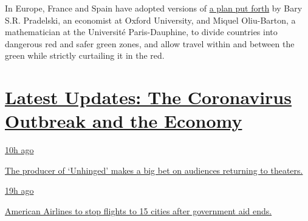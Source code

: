 In Europe, France and Spain have adopted versions of
\href{https://www.oecd-forum.org/channels/1642-international-co-operation/posts/toward-a-european-network-of-green-zones-to-avoid-summer-collapse}{a
plan put forth} by Bary S.R. Pradelski, an economist at Oxford
University, and Miquel Oliu-Barton, a mathematician at the Université
Paris-Dauphine, to divide countries into dangerous red and safer green
zones, and allow travel within and between the green while strictly
curtailing it in the red.

\hypertarget{latest-updates-the-coronavirus-outbreak-and-the-economy}{%
\section{\texorpdfstring{\href{https://www.nytimes3xbfgragh.onion/live/2020/08/20/business/stock-market-today-coronavirus?action=click\&pgtype=Article\&state=default\&region=MAIN_CONTENT_1\&context=storylines_live_updates}{Latest
Updates: The Coronavirus Outbreak and the
Economy}}{Latest Updates: The Coronavirus Outbreak and the Economy}}\label{latest-updates-the-coronavirus-outbreak-and-the-economy}}

\href{https://www.nytimes3xbfgragh.onion/live/2020/08/20/business/stock-market-today-coronavirus?action=click\&pgtype=Article\&state=default\&region=MAIN_CONTENT_1\&context=storylines_live_updates\#the-producer-of-unhinged-makes-a-big-bet-on-audiences-returning-to-theaters}{10h
ago}

\href{https://www.nytimes3xbfgragh.onion/live/2020/08/20/business/stock-market-today-coronavirus?action=click\&pgtype=Article\&state=default\&region=MAIN_CONTENT_1\&context=storylines_live_updates\#the-producer-of-unhinged-makes-a-big-bet-on-audiences-returning-to-theaters}{The
producer of `Unhinged' makes a big bet on audiences returning to
theaters.}

\href{https://www.nytimes3xbfgragh.onion/live/2020/08/20/business/stock-market-today-coronavirus?action=click\&pgtype=Article\&state=default\&region=MAIN_CONTENT_1\&context=storylines_live_updates\#american-airlines-to-stop-flights-to-15-cities-after-government-aid-ends}{19h
ago}

\href{https://www.nytimes3xbfgragh.onion/live/2020/08/20/business/stock-market-today-coronavirus?action=click\&pgtype=Article\&state=default\&region=MAIN_CONTENT_1\&context=storylines_live_updates\#american-airlines-to-stop-flights-to-15-cities-after-government-aid-ends}{American
Airlines to stop flights to 15 cities after government aid ends.}

